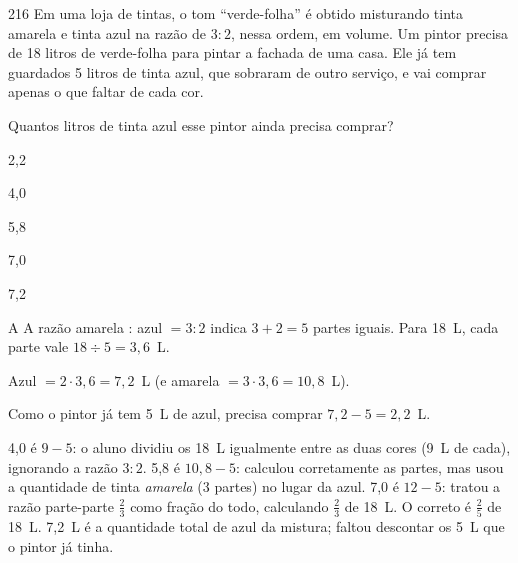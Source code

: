 \begin{questaoinedita}{2}{16}
Em uma loja de tintas, o tom ``verde-folha'' é obtido misturando tinta amarela e
tinta azul na razão de $3 : 2$, nessa ordem, em volume. Um pintor precisa de
18 litros de verde-folha para pintar a fachada de uma casa. Ele já tem guardados
5 litros de tinta azul, que sobraram de outro serviço, e vai comprar apenas o que
faltar de cada cor.

Quantos litros de tinta azul esse pintor ainda precisa comprar?
\begin{alternativas*}[5]
  \item 2,2
  \item 4,0
  \item 5,8
  \item 7,0
  \item 7,2
\end{alternativas*}
\end{questaoinedita}
\begin{resolucao}{A}
 A razão amarela : azul $= 3 : 2$ indica $3 + 2 = 5$ partes
iguais. Para 18~L, cada parte vale $18 \div 5 = 3{,}6$~L.

 Azul $= 2 \cdot 3{,}6 = 7{,}2$~L (e amarela
$= 3 \cdot 3{,}6 = 10{,}8$~L).

 Como o pintor já tem 5~L de azul, precisa comprar
$7{,}2 - 5 = 2{,}2$~L.
\begin{distratores}
 4,0 é $9 - 5$: o aluno dividiu os 18~L igualmente entre as duas cores (9~L de
cada), ignorando a razão $3 : 2$.
 5,8 é $10{,}8 - 5$: calculou corretamente as partes, mas usou a quantidade de
tinta \emph{amarela} (3 partes) no lugar da azul.
 7,0 é $12 - 5$: tratou a razão parte-parte $\frac{2}{3}$ como fração do todo,
calculando $\frac{2}{3}$ de 18~L. O correto é $\frac{2}{5}$ de 18~L.
 7,2~L é a quantidade total de azul da mistura; faltou descontar os 5~L que o
pintor já tinha.
\end{distratores}
\end{resolucao}

